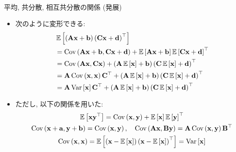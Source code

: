 \documentclass[dvipdfmx,notheorems,t]{beamer}
\begin{document}
\begin{frame}{平均, 共分散, 相互共分散の関係 (発展)}
\begin{itemize}
  \item 次のように変形できる:
  {\small \begin{align*}
    & \E{\left( \vb{A} \vb{x} + \vb{b} \right) \left( \vb{C} \vb{x} + \vb{d} \right)^\top} \\
    &= \Cov{\vb{A} \vb{x} + \vb{b}}{\vb{C} \vb{x} + \vb{d}}
      + \E{\vb{A} \vb{x} + \vb{b}} \E{\vb{C} \vb{x} + \vb{d}}^\top \\
    &= \Cov{\vb{A} \vb{x}}{\vb{C} \vb{x}}
      + \left( \vb{A} \E{\vb{x}} + \vb{b} \right) \left( \vb{C} \E{\vb{x}} + \vb{d} \right)^\top \\
    &= \vb{A} \Cov{\vb{x}}{\vb{x}} \vb{C}^\top
      + \left( \vb{A} \E{\vb{x}} + \vb{b} \right) \left( \vb{C} \E{\vb{x}} + \vb{d} \right)^\top \\
    &= \vb{A} \Var{\vb{x}} \vb{C}^\top
      + \left( \vb{A} \E{\vb{x}} + \vb{b} \right) \left( \vb{C} \E{\vb{x}} + \vb{d} \right)^\top
  \end{align*}}
  \item ただし, 以下の関係を用いた:
  {\small \begin{gather*}
    \E{\vb{x} \vb{y}^\top} = \Cov{\vb{x}}{\vb{y}} + \E{\vb{x}} \E{\vb{y}}^\top \\
    \Cov{\vb{x} + \vb{a}}{\vb{y} + \vb{b}} = \Cov{\vb{x}}{\vb{y}}, \quad
    \Cov{\vb{A} \vb{x}}{\vb{B} \vb{y}} = \vb{A} \Cov{\vb{x}}{\vb{y}} \vb{B}^\top \\
    \Cov{\vb{x}}{\vb{x}} = \E{\left( \vb{x} - \E{\vb{x}} \right)
      \left( \vb{x} - \E{\vb{x}} \right)^\top} = \Var{\vb{x}}
  \end{gather*}}
\end{itemize}
\end{frame}
\end{document}
